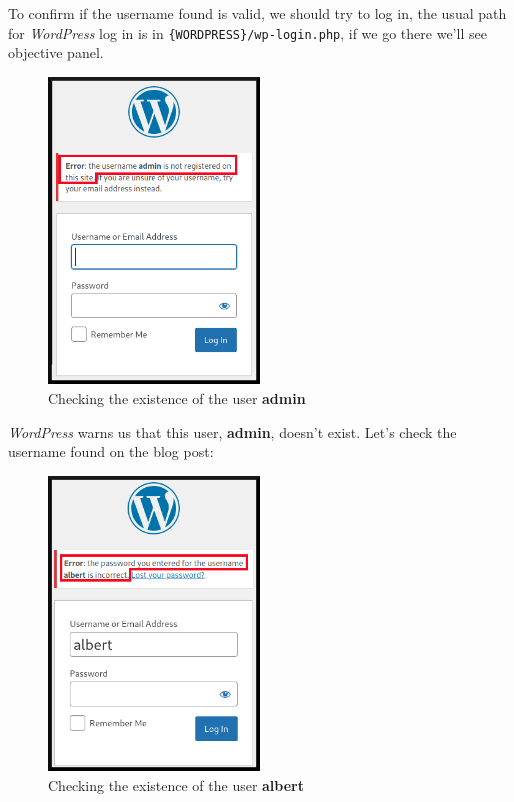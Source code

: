 \documentclass[12pt]{article}
\begin{document}
    To confirm if the username found is valid, we should try to log in, the
    usual path for \textit{WordPress} log in is in
    \verb!{WORDPRESS}/wp-login.php!, if we go there we'll see objective panel.

    \begin{figure}[H]\label{pic:14-wp-login-admin}
        \centering
        \includegraphics[width=0.50\textwidth]{14-wp-login-admin.png}
        \caption{Checking the existence of the user \textbf{admin}}
    \end{figure}

    \textit{WordPress} warns us that this user, \textbf{admin}, doesn't exist.
    Let's check the username found on the blog post:

    \begin{figure}[H]\label{pic:15-wp-login-albert}
        \centering
        \includegraphics[width=0.50\textwidth]{15-wp-login-albert.png}
        \caption{Checking the existence of the user \textbf{albert}}
    \end{figure}
\end{document}

